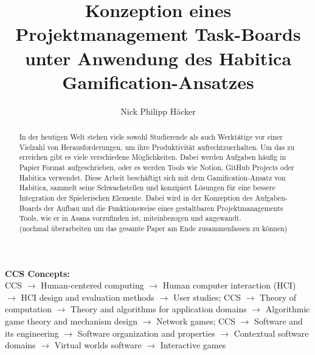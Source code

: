 \documentclass[sigconf, nonacm]{acmart}
\newcommand\holopagestyle{plain}
\begin{document}
\title{Konzeption eines Projektmanagement Task-Boards unter Anwendung des Habitica Gamification-Ansatzes}

\author{Nick Philipp Häcker}




\begin{abstract}
In der heutigen Welt stehen viele sowohl Studierende als auch Werktätige vor einer Vielzahl von Herausforderungen, um ihre Produktivität aufrechtzuerhalten. Um das zu erreichen gibt es viele verschiedene Möglichkeiten. Dabei werden Aufgaben häufig in Papier Format aufgeschrieben, oder es werden Tools wie Notion, GitHub Projects oder Habitica verwendet. 
Diese Arbeit beschäftigt sich mit dem Gamification-Ansatz von Habitica, sammelt seine Schwachstellen und konzipiert Lösungen für eine bessere Integration der Spielerischen Elemente. Dabei wird in der Konzeption des Aufgaben-Boards der Aufbau und die Funktionsweise eines gestaltbaren Projektmanagements Tools, wie er in Asana vorzufinden ist, miteinbezogen und angewandt.\\
(nochmal überarbeiten um das gesamte Paper am Ende zusammenfassen zu können)
\end{abstract}

\maketitle

\pagestyle{\holopagestyle}
\begingroup\small\noindent\raggedright\textbf{CCS Concepts:}\\
CCS $\rightarrow$ Human-centered computing $\rightarrow$ Human computer interaction (HCI) $\rightarrow$ HCI design and evaluation methods $\rightarrow$ User studies;
CCS $\rightarrow$ Theory of computation $\rightarrow$ Theory and algorithms for application domains $\rightarrow$ Algorithmic game theory and mechanism design $\rightarrow$ Network games; CCS $\rightarrow$ Software and its engineering $\rightarrow$ Software organization and properties $\rightarrow$ Contextual software domains $\rightarrow$ Virtual worlds software $\rightarrow$ Interactive games
\end{document}
